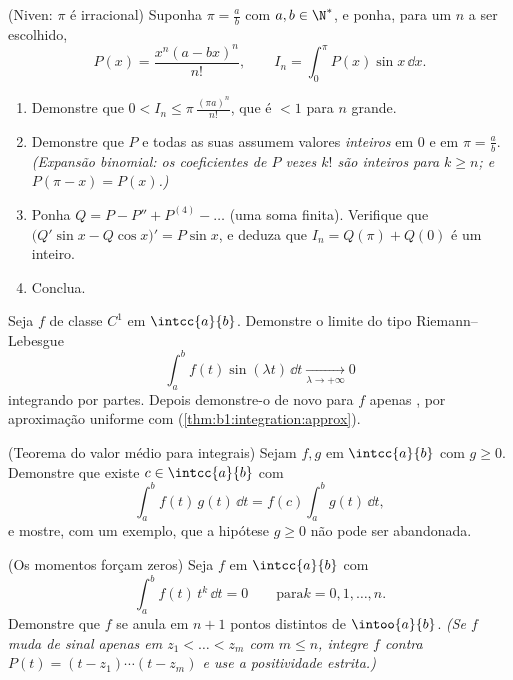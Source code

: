 \begin{exercise}[$\star\star\star$]\label{exo:b1:integration:9}
(Niven: $\pi$ é irracional) Suponha $\pi = \frac ab$ com $a, b \in
\N^*$, e ponha, para um $n$ a ser escolhido,
\[
P(x) = \frac{x^n (a - bx)^n}{n!},
\qquad
I_n = \int_0^{\pi} P(x)\sin x\, \dd x .
\]
\begin{enumerate}
  \item Demonstre que $0 < I_n \leq \pi\,\frac{(\pi a)^n}{n!}$, que é
        $< 1$ para $n$ grande.
  \item Demonstre que $P$ e todas as suas  assumem valores
        \emph{inteiros} em $0$ e em $\pi = \frac ab$. \emph{(Expansão
        binomial: os coeficientes de $P$ vezes $k!$ são inteiros
        para $k \geq n$; e $P(\pi - x) = P(x)$.)}
  \item Ponha $Q = P - P'' + P^{(4)} - \dots$ (uma soma finita). Verifique
        que $\bigl(Q'\sin x - Q\cos x\bigr)' = P \sin x$, e deduza
        que $I_n = Q(\pi) + Q(0)$ é um inteiro.
  \item Conclua.
\end{enumerate}
\end{exercise}

\begin{exercise}[$\star\star\star$]\label{exo:b1:integration:10}
Seja $f$ de classe $C^1$ em $\intcc{a}{b}$. Demonstre o limite do tipo
Riemann--Lebesgue
\[
\int_a^b f(t)\sin(\lambda t)\,\dd t \xrightarrow[\lambda \to
+\infty]{} 0
\]
integrando por partes. Depois demonstre-o de novo para $f$ apenas
, por aproximação uniforme com 
(\cref{thm:b1:integration:approx}).
\end{exercise}

\begin{exercise}[$\star\star$]\label{exo:b1:integration:11}
(Teorema do valor médio para integrais) Sejam $f, g$  em
$\intcc{a}{b}$ com $g \geq 0$. Demonstre que existe $c \in
\intcc{a}{b}$ com
\[
\int_a^b f(t)\,g(t)\,\dd t = f(c)\int_a^b g(t)\,\dd t ,
\]
e mostre, com um exemplo, que a hipótese $g \geq 0$ não pode ser
abandonada.
\end{exercise}

\begin{exercise}[$\star\star\star$]\label{exo:b1:integration:12}
(Os momentos forçam zeros) Seja $f$  em $\intcc{a}{b}$
com
\[
\int_a^b f(t)\,t^k\,\dd t = 0 \qquad \text{para} k = 0, 1,
\dots, n .
\]
Demonstre que $f$ se anula em $n + 1$ pontos distintos de
$\intoo{a}{b}$. \emph{(Se $f$ muda de sinal apenas em $z_1 < \dots
< z_m$ com $m \leq n$, integre $f$ contra $P(t) = (t - z_1)
\cdots (t - z_m)$ e use a positividade estrita.)}
\end{exercise}


